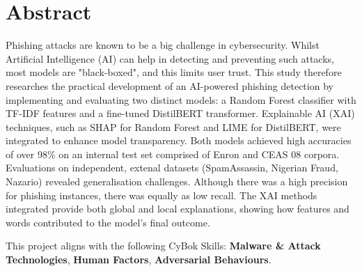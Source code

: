 
\section*{Abstract}

Phishing attacks are known to be a big challenge in cybersecurity. Whilst Artificial Intelligence (AI) can help in detecting and preventing such attacks, most models are "black-boxed", and this limits user trust. This study therefore researches the practical development of an AI-powered phishing detection by implementing and evaluating two distinct models: a Random Forest classifier with TF-IDF features and a fine-tuned DistilBERT transformer. Explainable AI (XAI) techniques, such as SHAP for Random Forest and LIME for DistilBERT, were integrated to enhance model transparency. Both models achieved high accuracies of over 98\% on an internal test set comprised of Enron and CEAS 08 corpora. Evaluations on independent, extenal datasets (SpamAssassin, Nigerian Fraud, Nazario) revealed generalisation challenges. Although there was a high precision for phishing instances, there was equally as low recall. The XAI methods integrated provide both global and local explanations, showing how features and words contributed to the model's final outcome.\newline

\large
\noindent This project aligns with the following CyBok Skills: \textbf{Malware \& Attack Technologies}, \textbf{Human Factors}, \textbf{Adversarial Behaviours}.